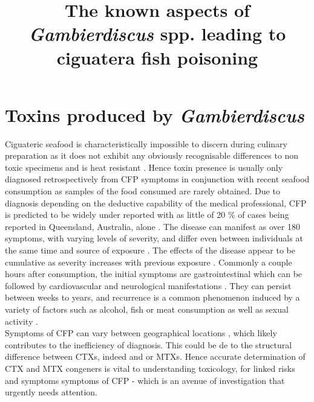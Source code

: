 \documentclass[12pt]{article}
\title{\textbf{The known aspects of \emph{Gambierdiscus} spp. leading to ciguatera fish poisoning}}
\date{}
\begin{document}
\section{Toxins produced by \emph{Gambierdiscus}}


Ciguateric seafood is characteristically impossible to discern during culinary preparation as it does not exhibit any obviously recognisable differences to non toxic specimens and is heat resistant \citep{withers1982ciguatera}. Hence toxin presence is usually only diagnosed retrospectively from CFP symptoms in conjunction with recent seafood consumption \citep{sims1987theoretical} as samples of the food consumed are rarely obtained. Due to diagnosis depending on the deductive capability of the medical professional, CFP is predicted to be widely under reported with as little of 20 \% of cases being reported  in Queensland, Australia, alone \citep{lewis2006ciguatera}. The disease can manifest as over 180 symptoms, with varying levels of severity, and differ even between individuals at the same time and source of exposure \citep{sims1987theoretical}. The effects of the disease appear to be cumulative as severity increases with previous exposure \citep{emerson1983preliminary}. Commonly a couple hours after consumption, the initial symptoms are gastrointestinal which can be followed by cardiovascular and neurological manifestations \citep{sims1987theoretical}. They can persist between weeks to years, and recurrence is a common phenomenon induced by a variety of factors such as alcohol, fish or meat consumption \citep{lewis2006ciguatera} as well as sexual activity \citep{lange1992travel}. \\
Symptoms of CFP can vary between geographical locations \citep{molgo2000ciguatera,dickey2010ciguatera}, which likely contributes to the inefficiency of diagnosis. This could be de to the structural difference between CTXs, indeed and or MTXs. Hence accurate determination of CTX and MTX congeners is vital to understanding toxicology, for linked risks and symptoms symptoms of CFP - which is an avenue of investigation that urgently needs attention.\\
\end{document}
